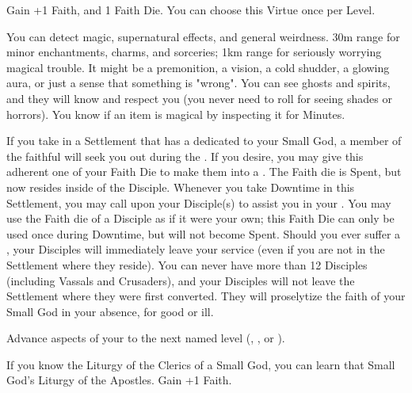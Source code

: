 \begin{multicols*}{2}
Gain +1 \MAX Faith, and 1 Faith Die. You can choose this Virtue once per Level.



You can detect magic, supernatural effects, and general weirdness. 30m range for minor enchantments, charms, and sorceries; 1km range for seriously worrying magical trouble. It might be a premonition, a vision, a cold shudder, a glowing aura, or just a sense that something is "wrong". You can see ghosts and spirits, and they will know and respect you (you never need to roll \INSANITY for seeing shades or horrors). You know if an item is magical by inspecting it for Minutes.


If you take  in a Settlement that has a  dedicated to your Small God, a member of the faithful will seek you out during the .  If you desire, you may give this adherent one of your Faith Die to make them into a . The Faith die is Spent, but now resides inside of the Disciple.  Whenever you take Downtime in this Settlement, you may call upon your Disciple(s) to assist you in your . You may use the Faith die of a Disciple as if it were your own; this Faith Die can only be used once during Downtime, but will not become Spent. Should you ever suffer a , your Disciples will immediately leave your service (even if you are not in the Settlement where they reside). You can never have more than 12 Disciples (including Vassals and Crusaders), and your Disciples will not leave the Settlement where they were first converted. They will proselytize the faith of your Small God in your absence, for good or ill.


Advance  aspects of your  to the next named level (\DEATH, \INJURY, or \INSANITY).


If you know the Liturgy of the Clerics of a Small God, you can learn that Small God's Liturgy of the Apostles. Gain +1 \MAX Faith.



\end{multicols*}
